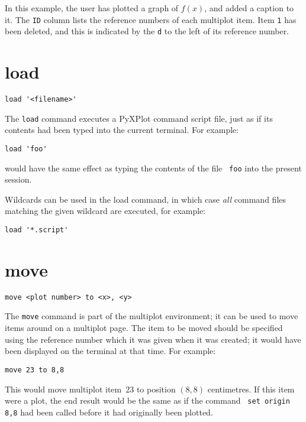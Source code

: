 In this example, the user has plotted a graph of $f(x)$, and added a caption to
it. The {\tt ID} column lists the reference numbers of each multiplot item.
Item {\tt 1} has been deleted, and this is indicated by the {\tt d} to the left
of its reference number.

\section{load}

\begin{verbatim}
load '<filename>'
\end{verbatim}

The {\tt load} command executes a PyXPlot command script file, just as if its
contents had been typed into the current terminal. For example:

\begin{verbatim}
load 'foo'
\end{verbatim}

\noindent would have the same effect as typing the contents of the file {\tt
foo} into the present session.

Wildcards can be used in the load command, in which case {\it all} command
files matching the given wildcard are executed, for example:

\begin{verbatim}
load '*.script'
\end{verbatim}

\section{move}

\begin{verbatim}
move <plot number> to <x>, <y>
\end{verbatim}

The {\tt move} command is part of the multiplot environment; it can be used to
move items around on a multiplot page. The item to be moved should be specified
using the reference number which it was given when it was created; it would
have been displayed on the terminal at that time. For example:

\begin{verbatim}
move 23 to 8,8
\end{verbatim}
  
\noindent This would move multiplot item~23 to position $(8,8)$ centimetres. If
this item were a plot, the end result would be the same as if the command {\tt
set origin 8,8} had been called before it had originally been plotted.

